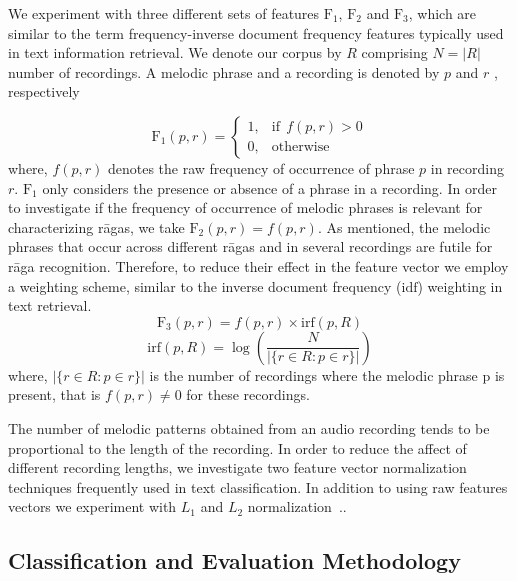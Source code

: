 We experiment with three different sets of features $\mathrm{F_1}$, $\mathrm{F_2}$ and $\mathrm{F_3}$, which are similar to the term frequency-inverse document frequency features typically used in text information retrieval. We denote our corpus by $R$  comprising $N = |R|$ number of recordings. A melodic phrase and a recording is denoted by $p$ and $r$ , respectively

\begin{equation}
\mathrm{F_1}(p,r)= 
\begin{cases}
1				,& \text{if}~~f(p,r) > 0\\
0,              & \text{otherwise}
\end{cases}
\end{equation}
where, $f(p,r)$ denotes the raw frequency of occurrence of phrase $p$ in recording $r$. $\mathrm{F_1}$ only considers the presence or absence of a phrase in a recording. In order to investigate if the frequency of occurrence of melodic phrases is relevant for characterizing r\={a}gas, we take $\mathrm{F_2}(p,r) = f(p,r)$. As mentioned, the melodic phrases that occur across different r\={a}gas and in several recordings are futile for r\={a}ga recognition. Therefore, to reduce their effect in the feature vector we employ a weighting scheme, similar to the inverse document frequency ($\mathrm{idf}$) weighting in text retrieval.
\begin{equation}
\mathrm{F_3}(p,r) = f(p,r) \times \mathrm{irf}(p,R)
\end{equation}
\begin{equation}
\mathrm{irf}(p,R) = \log \left( \frac{N}{ |\lbrace r \in R: p \in r \rbrace|} \right)
\end{equation}
where, $|\lbrace r \in R: p \in r \rbrace|$ is the number of recordings where the melodic phrase p is present, that is $f(p,r)\neq 0$ for these recordings. 

The number of melodic patterns obtained from an audio recording tends to be proportional to the length of the recording. In order to reduce the affect of different recording lengths, we investigate two feature vector normalization techniques frequently used in text classification. In addition to using raw features vectors we experiment with $L_1$ and $L_2$ normalization~\cite{leopold2002text}.. 


\subsection{Classification and Evaluation Methodology}
\label{sec:classification_based_raga_recognition}

